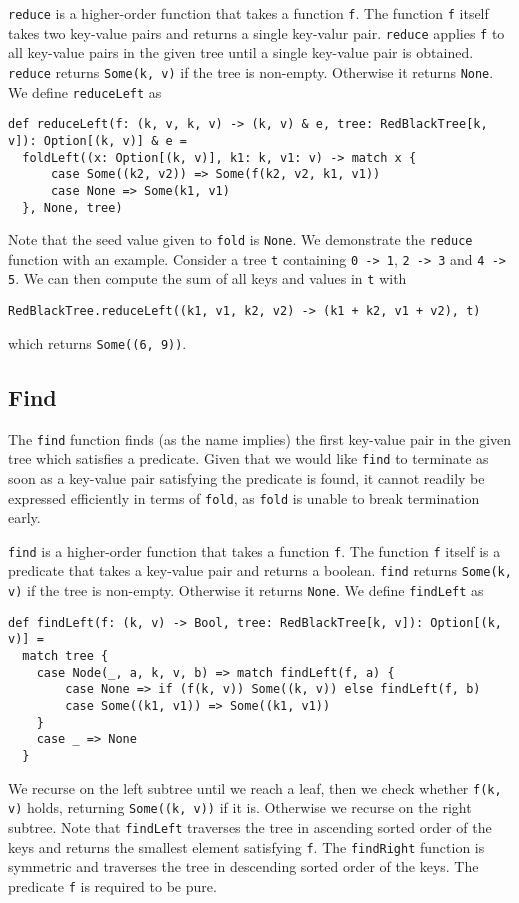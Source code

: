 \documentclass[../main.tex]{subfiles}
\begin{document}
\lstinline{reduce} is a higher-order function that takes a function \lstinline{f}. The function \lstinline{f} itself takes two key-value pairs and returns a single key-valur pair. \lstinline{reduce} applies \lstinline{f} to all key-value pairs in the given tree until a single key-value pair is obtained. \lstinline{reduce} returns \lstinline{Some(k, v)} if the tree is non-empty. Otherwise it returns \lstinline{None}. We define \lstinline{reduceLeft} as
\begin{lstlisting}[language=Flix]
def reduceLeft(f: (k, v, k, v) -> (k, v) & e, tree: RedBlackTree[k, v]): Option[(k, v)] & e =
  foldLeft((x: Option[(k, v)], k1: k, v1: v) -> match x {
      case Some((k2, v2)) => Some(f(k2, v2, k1, v1))
      case None => Some(k1, v1)
  }, None, tree)
\end{lstlisting}
Note that the seed value given to \lstinline{fold} is \lstinline{None}. We demonstrate the \lstinline{reduce} function with an example. Consider a tree \lstinline{t} containing \lstinline{0 -> 1}, \lstinline{2 -> 3} and \lstinline{4 -> 5}. We can then compute the sum of all keys and values in \lstinline{t} with
\begin{lstlisting}[language=Flix]
RedBlackTree.reduceLeft((k1, v1, k2, v2) -> (k1 + k2, v1 + v2), t)
\end{lstlisting}
which returns \lstinline{Some((6, 9))}.

\subsection{Find}

The \lstinline{find} function finds (as the name implies) the first key-value pair in the given tree which satisfies a predicate. Given that we would like \lstinline{find} to terminate as soon as a key-value pair satisfying the predicate is found, it cannot readily be expressed efficiently in terms of \lstinline{fold}, as \lstinline{fold} is unable to break termination early.

\lstinline{find} is a higher-order function that takes a function \lstinline{f}. The function \lstinline{f} itself is a predicate that takes a key-value pair and returns a boolean. \lstinline{find} returns \lstinline{Some(k, v)} if the tree is non-empty. Otherwise it returns \lstinline{None}. We define \lstinline{findLeft} as
\begin{lstlisting}[language=Flix]
def findLeft(f: (k, v) -> Bool, tree: RedBlackTree[k, v]): Option[(k, v)] =
  match tree {
    case Node(_, a, k, v, b) => match findLeft(f, a) {
        case None => if (f(k, v)) Some((k, v)) else findLeft(f, b)
        case Some((k1, v1)) => Some((k1, v1))
    }
    case _ => None
  }
\end{lstlisting}
We recurse on the left subtree until we reach a leaf, then we check whether \lstinline{f(k, v)} holds, returning \lstinline{Some((k, v))} if it is. Otherwise we recurse on the right subtree. Note that \lstinline{findLeft} traverses the tree in ascending sorted order of the keys and returns the smallest element satisfying \lstinline{f}. The \lstinline{findRight} function is symmetric and traverses the tree in descending sorted order of the keys. The predicate \lstinline{f} is required to be pure.
\end{document}
